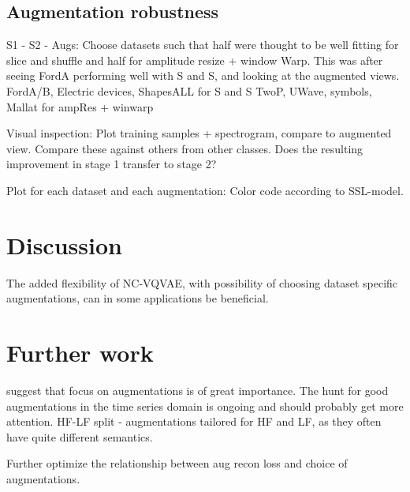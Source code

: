 \documentclass[../../thesis.tex]{subfiles}
\begin{document}
\subsection{Augmentation robustness}
\label{section:Augmentation robustness}
S1 - S2 - Augs: Choose datasets such that half were thought to be well fitting for slice and shuffle and half for amplitude resize + window Warp. This was after seeing FordA performing well with S and S, and looking at the augmented views.\newline
FordA/B, Electric devices, ShapesALL for S and S\newline
TwoP, UWave, symbols, Mallat for ampRes + winwarp\newline

Visual inspection: Plot training samples + spectrogram, compare to augmented view. Compare these against others from other classes. \newline
Does the resulting improvement in stage 1 transfer to stage 2? 

Plot for each dataset and each augmentation: 
Color code according to SSL-model.
\section{Discussion}
The added flexibility of NC-VQVAE, with possibility of choosing dataset specific augmentations, can in some applications be beneficial.\newline


\section{Further work}
\cite{morningstar2024augmentations} suggest that focus on augmentations is of great importance. The hunt for good augmentations in the time series domain is ongoing and should probably get more attention.\newline
HF-LF split - augmentations tailored for HF and LF, as they often have quite different semantics.\newline

Further optimize the relationship between aug recon loss and choice of augmentations.
\end{document}
